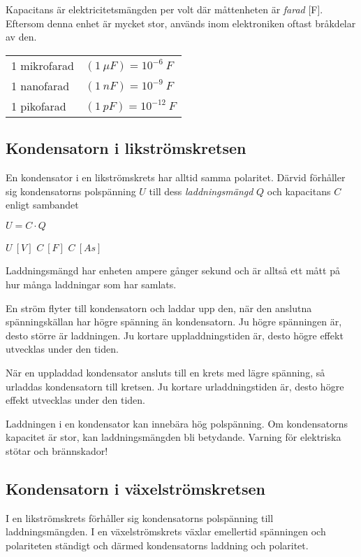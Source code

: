 Kapacitans är elektricitetsmängden per volt där måttenheten är \emph{farad} [F].
Eftersom denna enhet är mycket stor, används inom elektroniken oftast bråkdelar
av den.

\begin{tabular}{ll}
1 mikrofarad & \((1\ \mu F) = 10^{-6}\ F\) \\
1 nanofarad & \((1\ nF) = 10^{-9}\ F\) \\
1 pikofarad & \((1\ pF) = 10^{-12}\ F\) \\
\end{tabular}

\subsection{Kondensatorn i likströmskretsen}

En kondensator i en likströmskrets har alltid samma polaritet.
Därvid förhåller sig kondensatorns polspänning \(U\) till dess
\emph{laddningsmängd} \(Q\) och kapacitans \(C\) enligt sambandet

\(U = C \cdot Q\)

\(U\ [V]\) \(C\ [F]\) \(C\ [As]\)

Laddningsmängd har enheten ampere gånger sekund och är alltså ett mått på hur
många laddningar som har samlats.

En ström flyter till kondensatorn och laddar upp den, när den anslutna
spänningskällan har högre spänning än kondensatorn. Ju högre spänningen är,
desto större är laddningen. Ju kortare uppladdningstiden är, desto högre effekt
utvecklas under den tiden.

När en uppladdad kondensator ansluts till en krets med lägre spänning, så
urladdas kondensatorn till kretsen. Ju kortare urladdningstiden är, desto högre
effekt utvecklas under den tiden.

Laddningen i en kondensator kan innebära hög polspänning. Om kondensatorns
kapacitet är stor, kan laddningsmängden bli betydande. Varning för elektriska
stötar och brännskador!

\subsection{Kondensatorn i växelströmskretsen}

I en likströmskrets förhåller sig kondensatorns polspänning till
laddningsmängden. I en växelströmskrets växlar emellertid spänningen och
polariteten ständigt och därmed kondensatorns laddning och polaritet.

